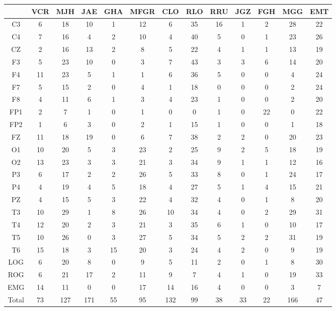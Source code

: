\begin{SidewaysFigure}
\centering
\begin{tabular}{c|ccccc|cccc|ccc}
& VCR & MJH & JAE & GHA & MFGR
& CLO & RLO & RRU & JGZ
& FGH & MGG & EMT \\
\hline
C3&6&18&10&1&12&6&35&16&1&2&28&22 \\
C4&7&16&4&2&10&4&40&5&0&1&23&26 \\
CZ&2&16&13&2&8&5&22&4&1&1&13&19 \\
F3&5&23&10&0&3&7&43&3&3&6&14&20 \\
F4&11&23&5&1&1&6&36&5&0&0&4&24 \\
F7&5&15&2&0&4&1&18&0&0&0&2&24 \\
F8&4&11&6&1&3&4&23&1&0&0&2&20 \\
FP1&2&7&1&0&1&0&0&1&0&22&0&22 \\
FP2&1&6&3&0&2&1&15&1&0&0&1&18 \\
FZ&11&18&19&0&6&7&38&2&2&0&20&23 \\
O1&10&20&5&3&23&2&25&9&2&5&18&19 \\
O2&13&23&3&3&21&3&34&9&1&1&12&16 \\
P3&6&17&2&2&26&5&33&8&0&1&24&17 \\
P4&4&19&4&5&18&4&27&5&1&4&15&21 \\
PZ&4&15&5&3&22&4&32&4&0&1&8&20 \\
T3&10&29&1&8&26&10&34&4&0&2&29&31 \\
T4&12&20&2&3&21&3&35&6&1&0&10&17 \\
T5&10&26&0&3&27&5&34&5&2&2&31&19 \\
T6&15&18&3&15&20&3&24&4&2&0&9&19 \\
LOG&6&20&8&0&9&5&11&2&0&1&8&30 \\
ROG&6&21&17&2&11&9&7&4&1&0&19&33 \\
EMG&14&11&0&0&17&14&16&4&0&0&3&7 \\
\hline
Total&73&127&171&55&95&132&99&38&33&22&166&47
\end{tabular}
\caption{Total de \'epocas PE clasificadas como sue\~no MOR 
(fase R) para cada
canal. %
}
\label{total_gpos_mor}
\end{SidewaysFigure}

